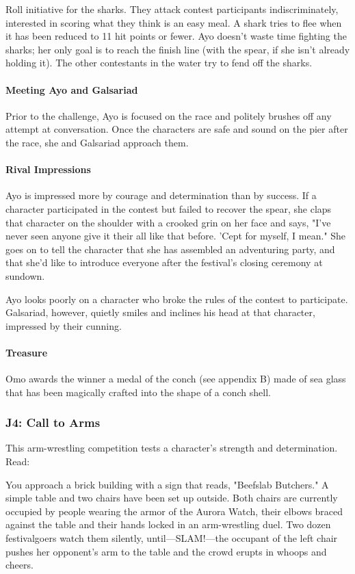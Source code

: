\documentclass[10pt,a4paper,twoside,twocolumn,openany,nodeprecatedcode]{dndbook}
\begin{document}
Roll initiative for the sharks. They attack contest participants indiscriminately, interested in scoring what they think is an easy meal. A shark tries to flee when it has been reduced to 11 hit points or fewer. Ayo doesn't waste time fighting the sharks; her only goal is to reach the finish line (with the spear, if she isn't already holding it). The other contestants in the water try to fend off the sharks.

\paragraph{Meeting Ayo and Galsariad}
Prior to the challenge, Ayo is focused on the race and politely brushes off any attempt at conversation. Once the characters are safe and sound on the pier after the race, she and Galsariad approach them.

\paragraph{Rival Impressions}
Ayo is impressed more by courage and determination than by success. If a character participated in the contest but failed to recover the spear, she claps that character on the shoulder with a crooked grin on her face and says, "I've never seen anyone give it their all like that before. 'Cept for myself, I mean." She goes on to tell the character that she has assembled an adventuring party, and that she'd like to introduce everyone after the festival's closing ceremony at sundown.

Ayo looks poorly on a character who broke the rules of the contest to participate. Galsariad, however, quietly smiles and inclines his head at that character, impressed by their cunning.

\paragraph{Treasure}
Omo awards the winner a medal of the conch (see appendix B) made of sea glass that has been magically crafted into the shape of a conch shell.

\subsubsection{J4: Call to Arms}
This arm-wrestling competition tests a character's strength and determination. Read:

\begin{DndReadAloud}{}
You approach a brick building with a sign that reads, "Beefslab Butchers." A simple table and two chairs have been set up outside. Both chairs are currently occupied by people wearing the armor of the Aurora Watch, their elbows braced against the table and their hands locked in an arm-wrestling duel. Two dozen festivalgoers watch them silently, until—SLAM!—the occupant of the left chair pushes her opponent's arm to the table and the crowd erupts in whoops and cheers.

\end{DndReadAloud}
\end{document}
